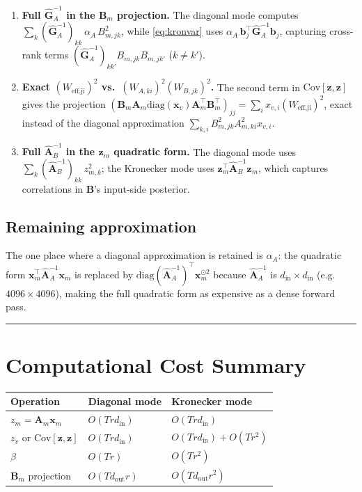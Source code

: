 \documentclass[11pt]{article}
\newcommand{\Cov}{\mathrm{Cov}}
\newcommand{\diag}{\mathrm{diag}}
\begin{document}
\begin{enumerate}
\item \textbf{Full $\hat{\bm G}_A^{-1}$ in the $\bm B_m$ projection.}
  The diagonal mode computes
  $\sum_k (\hat{\bm G}_A^{-1})_{kk}\,\alpha_A\,B_{m,jk}^2$,
  while \eqref{eq:kronvar} uses
  $\alpha_A\,\bm b_j^\top \hat{\bm G}_A^{-1}\bm b_j$,
  capturing cross-rank terms $(\hat{\bm G}_A^{-1})_{kk'}B_{m,jk}B_{m,jk'}$
  ($k \neq k'$).

\item \textbf{Exact $(W_\text{eff,ji})^2$ vs.\ $(W_{A,ki})^2(W_{B,jk})^2$.}
  The second term in $\Cov[\bm z,\bm z]$ gives the projection
  $(\bm B_m\bm A_m\diag(\bm x_v)\bm A_m^\top\bm B_m^\top)_{jj}
  = \sum_i x_{v,i}(W_\text{eff,ji})^2$,
  exact instead of the diagonal approximation
  $\sum_{k,i} B_{m,jk}^2 A_{m,ki}^2 x_{v,i}$.

\item \textbf{Full $\hat{\bm A}_B^{-1}$ in the $\bm z_m$ quadratic form.}
  The diagonal mode uses $\sum_k (\hat{\bm A}_B^{-1})_{kk}\,z_{m,k}^2$; the
  Kronecker mode uses $\bm z_m^\top\hat{\bm A}_B^{-1}\bm z_m$, which captures
  correlations in $\bm B$'s input-side posterior.
\end{enumerate}

\subsection{Remaining approximation}

The one place where a diagonal approximation is retained is $\alpha_A$:
the quadratic form $\bm x_m^\top \hat{\bm A}_A^{-1}\bm x_m$ is replaced by
$\diag(\hat{\bm A}_A^{-1})^\top\bm x_m^{\odot 2}$ because $\hat{\bm A}_A^{-1}$
is $d_\text{in}\times d_\text{in}$ (e.g.\ $4096\times 4096$), making the full
quadratic form as expensive as a dense forward pass.

\bigskip\hrule\bigskip

\section{Computational Cost Summary}

\begin{center}
\begin{tabular}{lll}
\toprule
Operation & Diagonal mode & Kronecker mode \\
\midrule
$z_m = \bm A_m \bm x_m$ & $O(Tr d_\text{in})$ & $O(Tr d_\text{in})$ \\
$z_v$ or $\Cov[\bm z,\bm z]$ & $O(Tr d_\text{in})$ & $O(Tr d_\text{in}) + O(Tr^2)$ \\
$\beta$ & $O(Tr)$ & $O(Tr^2)$ \\
$\bm B_m$ projection & $O(T d_\text{out} r)$ & $O(T d_\text{out} r^2)$ \\
\bottomrule
\end{tabular}
\end{center}
\end{document}
